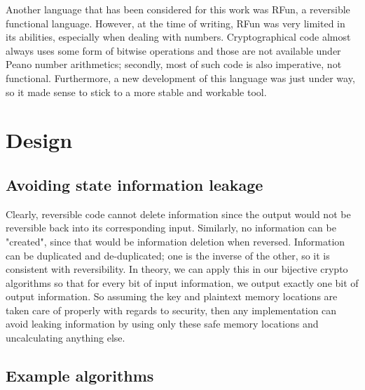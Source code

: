 \documentclass[a4paper,10pt,openright]{memoir}
\begin{document}
Another language that has been considered for this work was RFun, a 
reversible functional language. However, at the time of writing, RFun 
was very limited in its abilities, especially when dealing with 
numbers. Cryptographical code almost always uses some form of bitwise 
operations and those are not available under Peano number arithmetics; 
secondly, most of such code is also imperative, not functional. 
Furthermore, a new development of this language was just under way, so 
it made sense to stick to a more stable and workable tool.




\chapter{Design}


\section{Avoiding state information leakage}

Clearly, reversible code cannot delete information since the output 
would not be reversible back into its corresponding input. Similarly, 
no information can be "created", since that would be information 
deletion when reversed. Information can be duplicated and 
de-duplicated; one is the inverse of the other, so it is consistent 
with reversibility. In theory, we can apply this in our bijective 
crypto algorithms so that for every bit of input information, we output 
exactly one bit of output information. So assuming the key and 
plaintext memory locations are taken care of properly with regards to 
security, then any implementation can avoid leaking information by 
using only these safe memory locations and uncalculating anything else.

\section{Example algorithms}
\end{document}
